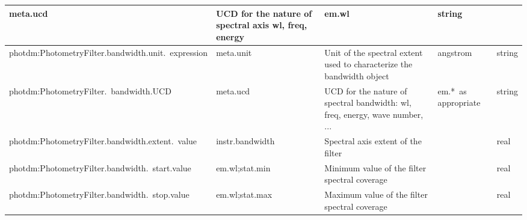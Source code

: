 \documentclass[11pt,a4paper]{ivoa}
\begin{document}
\begin{appendices}
\begin{table}[H]
\begin{adjustbox}{angle=90}
\begin{tabular}{p{2.5in}|p{1.5in}|p{2in}|p{0.74in}|p{0.35in}}
\multicolumn{1}{p{1.5in}}{{\fontsize{8pt}{8pt}\selectfont meta.ucd }} &
\multicolumn{1}{p{2in}}{{\fontsize{8pt}{8pt}\selectfont UCD for the nature of 
spectral axis wl, freq, energy}} &
\multicolumn{1}{p{0.74in}}{{\fontsize{8pt}{8pt}\selectfont em.wl}} &
\multicolumn{1}{p{0.35in}}{{\fontsize{8pt}{8pt}\selectfont string}} \\
\hline
\multicolumn{1}{p{2.5in}}{{\fontsize{8pt}{8pt}
\selectfont photdm:PhotometryFilter.bandwidth.unit.\ expression}} &
\multicolumn{1}{p{1.5in}}{{\fontsize{8pt}{8pt}\selectfont meta.unit}} &
\multicolumn{1}{p{2in}}{{\fontsize{8pt}{8pt}\selectfont Unit of the spectral extent 
used to characterize the bandwidth object}} &
\multicolumn{1}{p{0.74in}}{{\fontsize{8pt}{8pt}\selectfont angstrom}} &
\multicolumn{1}{p{0.35in}}{{\fontsize{8pt}{8pt}\selectfont string}} \\
\hline
\multicolumn{1}{p{2.5in}}{
{\fontsize{8pt}{8pt}\selectfont photdm:PhotometryFilter.\ bandwidth.UCD}} &
\multicolumn{1}{p{1.5in}}{{\fontsize{8pt}{8pt}\selectfont meta.ucd }} &
\multicolumn{1}{p{2in}}{{\fontsize{8pt}{8pt}\selectfont UCD for the nature of 
spectral bandwidth: wl, freq, energy, wave number, ...}} &
\multicolumn{1}{p{0.74in}}{{\fontsize{8pt}{8pt}\selectfont em.*\ as appropriate}} &
\multicolumn{1}{p{0.35in}}{{\fontsize{8pt}{8pt}\selectfont string}} \\
\hline
\multicolumn{1}{p{2.5in}}{{\fontsize{8pt}{8pt}\selectfont photdm:PhotometryFilter.bandwidth.extent.\ value}} &
\multicolumn{1}{p{1.5in}}{{\fontsize{8pt}{8pt}\selectfont instr.bandwidth}} &
\multicolumn{1}{p{2in}}{{\fontsize{8pt}{8pt}\selectfont Spectral axis extent of the filter}} &
\multicolumn{1}{p{0.74in}}{} &
\multicolumn{1}{p{0.35in}}{{\fontsize{8pt}{8pt}\selectfont real}} \\
\hline
\multicolumn{1}{p{2.5in}}{{\fontsize{8pt}{8pt}
\selectfont photdm:PhotometryFilter.bandwidth.\ start.value}} &
\multicolumn{1}{p{1.5in}}{{\fontsize{8pt}{8pt}\selectfont em.wl;stat.min}} &
\multicolumn{1}{p{2in}}{{\fontsize{8pt}{8pt}\selectfont Minimum value of the filter 
spectral coverage}} &
\multicolumn{1}{p{0.74in}}{} &
\multicolumn{1}{p{0.35in}}{{\fontsize{8pt}{8pt}\selectfont real}} \\
\hline
\multicolumn{1}{p{2.5in}}{{\fontsize{8pt}{8pt}
\selectfont photdm:PhotometryFilter.bandwidth.\ stop.value}} &
\multicolumn{1}{p{1.5in}}{{\fontsize{8pt}{8pt}\selectfont em.wl;stat.max}} &
\multicolumn{1}{p{2in}}{{\fontsize{8pt}{8pt}\selectfont Maximum value of the 
filter spectral coverage}} &
\multicolumn{1}{p{0.74in}}{} &
\multicolumn{1}{p{0.35in}}{{\fontsize{8pt}{8pt}\selectfont real}} \\
\hline
\end{tabular}
\end{adjustbox}
 \end{table}



\end{appendices}
\end{document}
